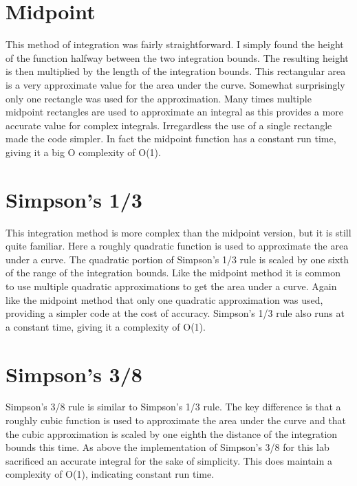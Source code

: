 \documentclass{article}
\begin{document}
\section{Midpoint}
This method of integration was fairly straightforward. I simply found the height of the function halfway between the two integration bounds. The resulting height is then multiplied by the length of the integration bounds. This rectangular area is a very approximate value for the area under the curve. Somewhat surprisingly only one rectangle was used for the approximation. Many times multiple midpoint rectangles are used to approximate an integral as this provides a more accurate value for complex integrals. Irregardless the use of a single rectangle made the code simpler. In fact the midpoint function has a constant run time, giving it a big O complexity of O(1).

\section{Simpson's 1/3}
This integration method is more complex than the midpoint version, but it is still quite familiar. Here a roughly quadratic function is used to approximate the area under a curve. The quadratic portion of Simpson's 1/3 rule is scaled by one sixth of the range of the integration bounds. Like the midpoint method it is common to use multiple quadratic approximations to get the area under a curve. Again like the midpoint method that only one quadratic approximation was used, providing a simpler code at the cost of accuracy. Simpson's 1/3 rule also runs at a constant time, giving it a complexity of O(1).

\section{Simpson's 3/8}
Simpson's 3/8 rule is similar to Simpson's 1/3 rule. The key difference is that a roughly cubic function is used to approximate the area under the curve and that the cubic approximation is scaled by one eighth the distance of the integration bounds this time. As above the implementation of Simpson's 3/8 for this lab sacrificed an accurate integral for the sake of simplicity. This does maintain a complexity of O(1), indicating constant run time.
\end{document}
